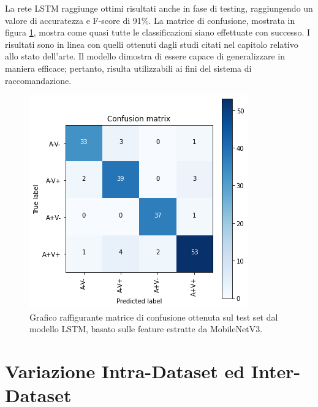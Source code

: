 \documentclass[11pt]{report}
\begin{document}
La rete LSTM raggiunge ottimi risultati anche in fase di testing, raggiungendo un valore di accuratezza e F-score di 91\%. La matrice di confusione, mostrata in figura \ref{fig:LSTM-cm}, mostra come quasi tutte le classificazioni siano effettuate con successo. I risultati sono in linea con quelli ottenuti dagli studi citati nel capitolo relativo allo stato dell'arte. Il modello dimostra di essere capace di generalizzare in maniera efficace; pertanto, risulta utilizzabili ai fini del sistema di raccomandazione.

\vspace{2cm}

\begin{figure}[h]
    \centering
    \includegraphics[scale=0.7]{img/confusion-matrix-lstm.png}
    \caption{Grafico raffigurante matrice di confusione ottenuta sul test set dal modello LSTM, basato sulle feature estratte da MobileNetV3.}
    \label{fig:LSTM-cm}
\end{figure}

\newpage

\section{Variazione Intra-Dataset ed Inter-Dataset}
\end{document}

